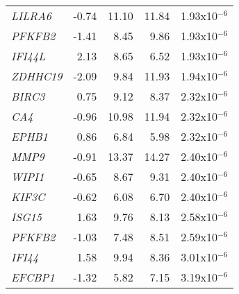 \begin{center}
\begin{longtable}[p]{ l r r r r }
\textit{LILRA6}   & -0.74 & 11.10 & 11.84 & 1.93x10$^{-6}$ \\
\textit{PFKFB2}   & -1.41 & 8.45  & 9.86  & 1.93x10$^{-6}$ \\
\textit{IFI44L}   & 2.13  & 8.65  & 6.52  & 1.93x10$^{-6}$ \\
\textit{ZDHHC19}  & -2.09 & 9.84  & 11.93 & 1.94x10$^{-6}$ \\
\textit{BIRC3}    & 0.75  & 9.12  & 8.37  & 2.32x10$^{-6}$ \\
\textit{CA4}      & -0.96 & 10.98 & 11.94 & 2.32x10$^{-6}$ \\
\textit{EPHB1}    & 0.86  & 6.84  & 5.98  & 2.32x10$^{-6}$ \\
\textit{MMP9}     & -0.91 & 13.37 & 14.27 & 2.40x10$^{-6}$ \\
\textit{WIPI1}    & -0.65 & 8.67  & 9.31  & 2.40x10$^{-6}$ \\
\textit{KIF3C}    & -0.62 & 6.08  & 6.70  & 2.40x10$^{-6}$ \\
\textit{ISG15}    & 1.63  & 9.76  & 8.13  & 2.58x10$^{-6}$ \\
\textit{PFKFB2}   & -1.03 & 7.48  & 8.51  & 2.59x10$^{-6}$ \\
\textit{IFI44}    & 1.58  & 9.94  & 8.36  & 3.01x10$^{-6}$ \\
\textit{EFCBP1}   & -1.32 & 5.82  & 7.15  & 3.19x10$^{-6}$ \\
\end{longtable}
\bigskip


\end{center}
